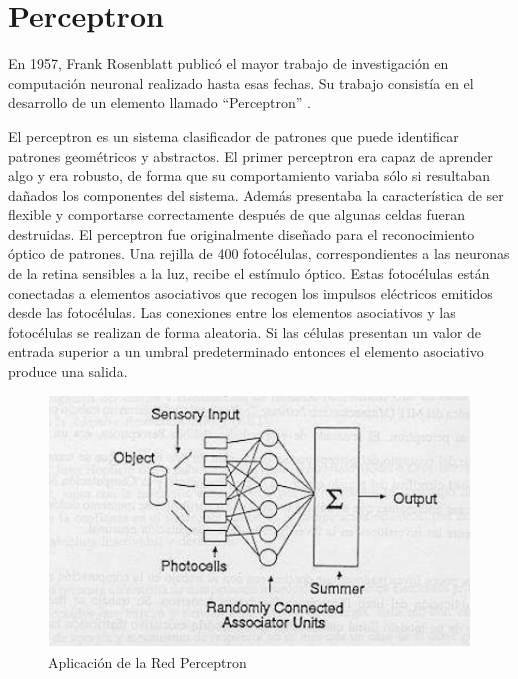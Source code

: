 \section{Perceptron}
\vspace{1\baselineskip}
En 1957, Frank Rosenblatt publicó el mayor trabajo de investigación en computación neuronal realizado hasta esas fechas. Su trabajo consistía en el desarrollo de un
elemento llamado “Perceptron” \cite{olabe1998redes}.

\vspace{1\baselineskip}
El perceptron es un sistema clasificador de patrones que puede identificar patrones geométricos y abstractos. El primer perceptron era capaz de aprender algo y era robusto, de forma que su comportamiento variaba sólo si resultaban dañados los componentes del sistema. 
Además presentaba la característica de ser flexible y comportarse correctamente después de que algunas celdas fueran destruidas.
El perceptron fue originalmente diseñado para el reconocimiento óptico de patrones.
Una rejilla de 400 fotocélulas, correspondientes a las neuronas de la retina sensibles a la luz, recibe el estímulo óptico. Estas fotocélulas están conectadas a elementos asociativos que recogen los impulsos eléctricos emitidos desde las fotocélulas. Las
conexiones entre los elementos asociativos y las fotocélulas se realizan de forma aleatoria.
Si las células presentan un valor de entrada superior a un umbral predeterminado entonces el elemento asociativo produce una salida.

\begin{figure}[H]
  \begin{center}
    \includegraphics[scale=0.90]{./perceptron.png}
    \caption{Aplicación de la Red Perceptron}
    \label{fig:perceptron}
  \end{center}
\end{figure}

